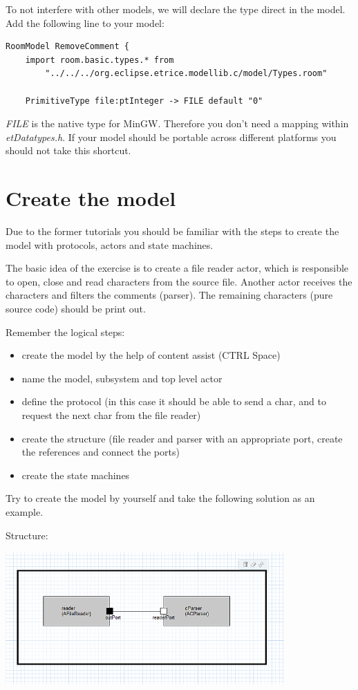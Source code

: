 To not interfere with other models, we will declare the type direct in the model.
Add the following line to your model:

\begin{small}
\begin{verbatim}
RoomModel RemoveComment {
	import room.basic.types.* from 
		"../../../org.eclipse.etrice.modellib.c/model/Types.room"
	
	PrimitiveType file:ptInteger -> FILE default "0"
\end{verbatim}
\end{small}

\textit{FILE} is the native type for MinGW. Therefore you don't need a mapping within 
\textit{etDatatypes.h}. If your model should be portable across different platforms you should not take 
this shortcut.
 
\section{Create the model}

Due to the former tutorials you should be familiar with the steps to create the model with protocols, 
actors and state machines.

The basic idea of the exercise is to create a file reader actor, which is responsible to open, close and 
read characters from the source file. Another actor receives the characters and filters the comments 
(parser). The remaining characters (pure source code) should be print out. 

Remember the logical steps: 
\begin{itemize}
\item create the model by the help of content assist (CTRL Space)
\item name the model, subsystem and top level actor
\item define the protocol (in this case it should be able to send a char, and to request the next char 
from the file reader)
\item create the structure (file reader and parser with an appropriate port, create the references and 
connect the ports)
\item create the state machines
\end{itemize}

Try to create the model by yourself and take the following solution as an example.

Structure:

\includegraphics[width=0.8\textwidth]{images/036-RemoveCommentC04.png}

